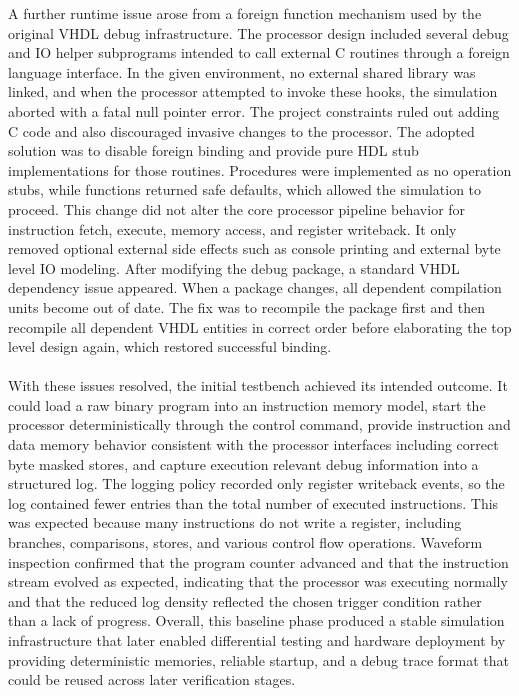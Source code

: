 \documentclass[12pt]{article}
\begin{document}
A further runtime issue arose from a foreign function mechanism used by the original VHDL debug infrastructure. The processor design included several debug and IO helper subprograms intended to call external C routines through a foreign language interface. In the given environment, no external shared library was linked, and when the processor attempted to invoke these hooks, the simulation aborted with a fatal null pointer error. The project constraints ruled out adding C code and also discouraged invasive changes to the processor. The adopted solution was to disable foreign binding and provide pure HDL stub implementations for those routines. Procedures were implemented as no operation stubs, while functions returned safe defaults, which allowed the simulation to proceed. This change did not alter the core processor pipeline behavior for instruction fetch, execute, memory access, and register writeback. It only removed optional external side effects such as console printing and external byte level IO modeling. After modifying the debug package, a standard VHDL dependency issue appeared. When a package changes, all dependent compilation units become out of date. The fix was to recompile the package first and then recompile all dependent VHDL entities in correct order before elaborating the top level design again, which restored successful binding.
\\
\\
With these issues resolved, the initial testbench achieved its intended outcome. It could load a raw binary program into an instruction memory model, start the processor deterministically through the control command, provide instruction and data memory behavior consistent with the processor interfaces including correct byte masked stores, and capture execution relevant debug information into a structured log. The logging policy recorded only register writeback events, so the log contained fewer entries than the total number of executed instructions. This was expected because many instructions do not write a register, including branches, comparisons, stores, and various control flow operations. Waveform inspection confirmed that the program counter advanced and that the instruction stream evolved as expected, indicating that the processor was executing normally and that the reduced log density reflected the chosen trigger condition rather than a lack of progress. Overall, this baseline phase produced a stable simulation infrastructure that later enabled differential testing and hardware deployment by providing deterministic memories, reliable startup, and a debug trace format that could be reused across later verification stages.
\end{document}
